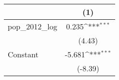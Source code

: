 {
\def\sym#1{\ifmmode^{#1}\else\(^{#1}\)\fi}
\begin{tabular}{l*{1}{c}}
\toprule
                    &\multicolumn{1}{c}{(1)}         \\
\midrule
pop\_2012\_log        &       0.235\sym{***}\\
                    &      (4.43)         \\
\addlinespace
Constant            &      -5.681\sym{***}\\
                    &     (-8.39)         \\
\bottomrule
\end{tabular}
}
